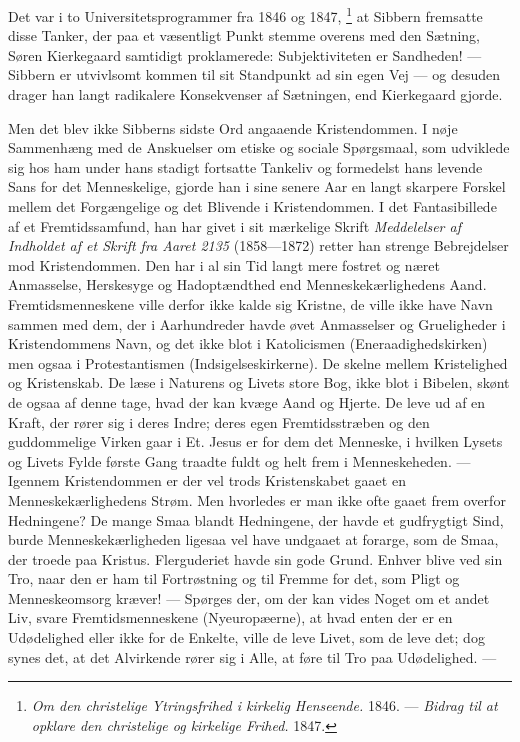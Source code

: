 \documentclass[12pt,a4paper,openany]{book}
\newcommand{\opage}[1]{\marginnote{\footnotesize\textit{[#1]}}}
\begin{document}
\setcounter{footnote}{0}%
\opage{108}Det var i to Universitetsprogrammer fra 1846 og 1847,%
\footnote[1]{\textit{Om den christelige Ytringsfrihed i kirkelig Henseende.}
1846. --- \textit{Bidrag til at opklare den christelige og kirkelige Frihed.}
1847.} at Sibbern fremsatte disse Tanker, der paa et væsentligt Punkt stemme
overens med den Sætning, Søren Kierkegaard samtidigt proklamerede:
Subjektiviteten er Sandheden! --- Sibbern er utvivlsomt kommen til sit
Standpunkt ad sin egen Vej --- og desuden drager han langt radikalere
Konsekvenser af Sætningen, end Kierkegaard gjorde.

Men det blev ikke Sibberns sidste Ord angaaende Kristendommen. I nøje
Sammenhæng med de Anskuelser om etiske og sociale Spørgsmaal, som udviklede sig
hos ham under hans stadigt fortsatte Tankeliv og formedelst hans levende Sans
for det Menneskelige, gjorde han i sine senere Aar en langt skarpere Forskel
mellem det Forgængelige og det Blivende i Kristendommen. I det Fantasibillede
af et Fremtidssamfund, han har givet i sit mærkelige Skrift \textit{Meddelelser
af Indholdet af et Skrift fra Aaret 2135} (1858---1872) retter han strenge
Bebrejdelser mod Kristendommen. Den har i al sin Tid langt mere fostret og
næret Anmasselse, Herskesyge og Hadoptændthed end Menneskekærlighedens Aand.
Fremtidsmenneskene ville derfor ikke kalde sig Kristne, de ville ikke have Navn
sammen med dem, der i Aarhundreder havde øvet Anmasselser og Grueligheder i
Kristendommens Navn, og det ikke blot i Katolicismen (Eneraadighedskirken) men
ogsaa i Protestantismen (Indsigelseskirkerne). De skelne mellem Kristelighed og
Kristenskab. De læse i Naturens og Livets store Bog, ikke blot i Bibelen, skønt
de ogsaa af denne tage, hvad der kan kvæge Aand og Hjerte. De leve ud af en
Kraft, der rører sig i deres Indre; deres egen Fremtidsstræben og den
guddommelige Virken gaar i Et. Jesus er for dem det Menneske, i hvilken Lysets
og Livets Fylde første Gang traadte fuldt og helt frem i Menneskeheden. ---
Igennem Kristendommen er der vel trods Kristenskabet gaaet en
Menneskekærlighedens Strøm. Men hvorledes er man ikke ofte gaaet frem overfor
Hedningene? De mange Smaa blandt Hedningene, der havde et gudfrygtigt Sind,
\setcounter{footnote}{0}%
\opage{109}burde Menneskekærligheden ligesaa vel have undgaaet at forarge, som
de Smaa, der troede paa Kristus. Flerguderiet havde sin gode Grund. Enhver
blive ved sin Tro, naar den er ham til Fortrøstning og til Fremme for det, som
Pligt og Menneskeomsorg kræver! --- Spørges der, om der kan vides Noget om et
andet Liv, svare Fremtidsmenneskene (Nyeuropæerne), at hvad enten der er en
Udødelighed eller ikke for de Enkelte, ville de leve Livet, som de leve det;
dog synes det, at det Alvirkende rører sig i Alle, at føre til Tro paa
Udødelighed. ---
\end{document}
